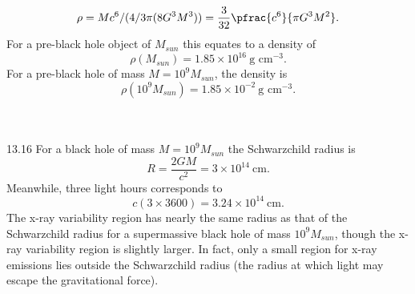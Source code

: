 \documentclass[10pt,letterpaper]{article}
\begin{document}
\[
	\rho = Mc^6/(4/3\pi (8 G^3 M^3)) = \frac{3}{32} \pfrac{c^6}{\pi G^3 M^2}.
\]
For a pre-black hole object of $M_{sun}$ this equates to a density of 
\[
	\rho(M_{sun}) = 1.85\times 10^{16}\ \text{g cm}^{-3}.
\]
For a pre-black hole of mass $M = 10^9 M_{sun}$, the density is
\[
	\rho(10^9 M_{sun})= 1.85\times 10^{-2}\ \text{g cm}^{-3}.
\]
\\ \\
\item[13.16]
For a black hole of mass $M=10^9 M_{sun}$ the Schwarzchild radius is
\[
	R = \frac{2GM}{c^2} = 3\times 10^{14}\ \text{cm}.
\]
Meanwhile, three light hours corresponds to
\[
	c(3\times 3600) = 3.24\times 10^{14}\ \text{cm}.
\]
The x-ray variability region has nearly the same radius as that of the Schwarzchild radius for a supermassive black hole of mass $10^9 M_{sun}$, though the x-ray variability region is slightly larger. In fact, only a small region for x-ray emissions lies outside the Schwarzchild radius (the radius at which light may escape the gravitational force). 
\eenum
\end{document}
